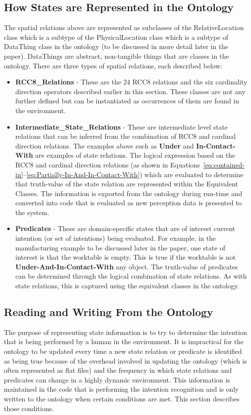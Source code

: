 \documentclass[preprint,12pt]{elsarticle}
\newcommand{\sr}[1] {\textbf{#1}}
\newcommand{\class}[1] {\textsf{#1}}
\begin{document}
\subsection{How States are Represented in the Ontology}
The spatial relations above are represented as subclasses of the \class{RelativeLocation} class which is a subtype of the \class{PhysicalLocation} class which is a subtype of \class{DataThing} class in the ontology (to be discussed in more detail later in the paper). \class{DataThings} are abstract, non-tangible things that are classes in the ontology. There are three types of spatial relations, each described below:
\begin{itemize}
\item \textbf{RCC8\_Relations} - These are the 24 RCC8 relations and the six cardinality direction operators described earlier in this section. These classes are not any further defined but can be instantiated as occurrences of them are found in the environment.
\item \textbf{Intermediate\_State\_Relations} - These are intermediate level state relations that can be inferred from the combination of RCC8 and cardinal direction relations. The examples above such as \sr{Under} and \sr{In-Contact-With} are examples of state relations. The logical expression based on the RCC8 and cardinal direction relations (as shown in Equations~\ref{eq:contained-in}--\ref{eq:Partially-In-And-In-Contact-With}) which are evaluated to determine that truth-value of the state relation are represented within the Equivalent Classes. The information is exported from the ontology during run-time and converted into code that is evaluated as new perception data is presented to the system.
\item \textbf{Predicates} - These are domain-specific states that are of interest current intention (or set of intentions) being evaluated. For example, in the manufacturing example to be discussed later in the paper, one state of interest is that the worktable is empty. This is true if the worktable is not \sr{Under-And-In-Contact-With} any object. The truth-value of predicates can be determined through the logical combination of state relations. As with state relations, this is captured using the equivalent classes in the ontology.
\end{itemize}


\subsection{Reading and Writing From the Ontology}
The purpose of representing state information is to try to determine the intention that is being performed by a human in the environment. It is impractical for the ontology to be updated every time a new state relation or predicate is identified as being true because of the overhead involved in updating the ontology (which is often represented as flat files) and the frequency in which state relations and predicates can change in a highly dynamic environment.  This information is maintained in the code that is performing the intention recognition and is only written to the ontology when certain conditions are met. This section describes those conditions.
\end{document}

